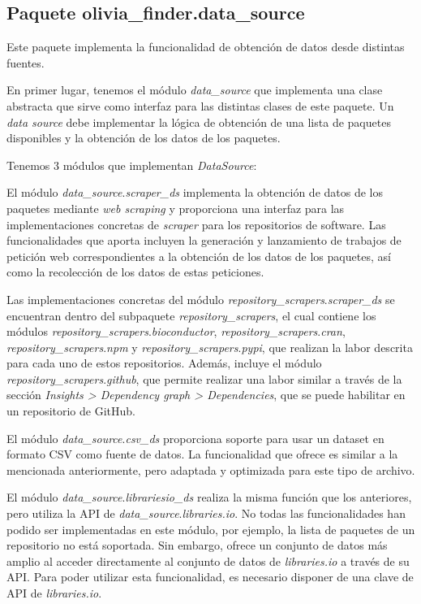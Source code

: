 \subsection{Paquete olivia\_finder.data\_source}

Este paquete implementa la funcionalidad de obtención de datos desde distintas fuentes.

En primer lugar, tenemos el módulo \textit{data\_source} que implementa una clase abstracta que 
sirve como interfaz para las distintas clases de este paquete. Un \textit{data source} debe implementar
 la lógica de obtención de una lista de paquetes disponibles y la obtención de los datos de los paquetes.

Tenemos 3 módulos que implementan \textit{DataSource}:

El módulo \textit{data\_source}.\textit{scraper\_ds} implementa la obtención de datos de los paquetes 
mediante \textit{web scraping} y proporciona una interfaz para las implementaciones concretas
 de \textit{scraper} para los repositorios de software. Las funcionalidades que aporta incluyen 
 la generación y lanzamiento de trabajos de petición web correspondientes a la obtención de los datos 
 de los paquetes, así como la recolección de los datos de estas peticiones.

Las implementaciones concretas del módulo \textit{repository\_scrapers}.\textit{scraper\_ds} se encuentran 
dentro del subpaquete \textit{repository\_scrapers}, el cual contiene los módulos \textit{repository\_scrapers}.\textit{bioconductor},
\textit{repository\_scrapers}.\textit{cran}, \textit{repository\_scrapers}.\textit{npm} 
y \textit{repository\_scrapers}.\textit{pypi}, que realizan la labor descrita para cada uno de 
estos repositorios. Además, incluye el módulo \textit{repository\_scrapers}.\textit{github}, que permite 
realizar una labor similar a través de la sección \textit{Insights > Dependency graph > Dependencies}, que se puede 
habilitar en un repositorio de GitHub.

El módulo \textit{data\_source}.\textit{csv\_ds} proporciona soporte para usar un dataset en formato CSV como fuente de 
datos. La funcionalidad que ofrece es similar a la mencionada anteriormente, pero adaptada y optimizada 
para este tipo de archivo.

El módulo \textit{data\_source}.\textit{librariesio\_ds} realiza la misma función que los anteriores, pero utiliza la 
API de \textit{data\_source}.\textit{libraries.io}. No todas las funcionalidades han podido ser implementadas en este 
módulo, por ejemplo, la lista de paquetes de un repositorio no está soportada. Sin embargo, ofrece 
un conjunto de datos más amplio al acceder directamente al conjunto de datos de \textit{libraries.io} 
a través de su API. Para poder utilizar esta funcionalidad, es necesario disponer de una clave de API 
de \textit{libraries.io}.